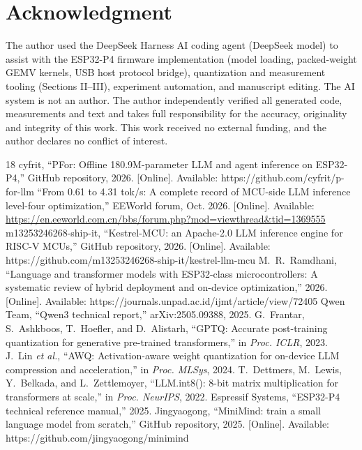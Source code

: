 \documentclass[journal,letterpaper]{IEEEtran}
\begin{document}
\section*{Acknowledgment}
The author used the DeepSeek Harness AI coding agent (DeepSeek model) to assist with the
ESP32-P4 firmware implementation (model loading, packed-weight GEMV kernels, USB host protocol
bridge), quantization and measurement tooling (Sections II--III), experiment automation, and
manuscript editing. The AI system is not an author. The author independently verified all
generated code, measurements and text and takes full responsibility for the accuracy,
originality and integrity of this work. This work received no external funding, and the author
declares no conflict of interest.

\begin{thebibliography}{18}
 cyfrit, ``PFor: Offline 180.9M-parameter LLM and agent inference on ESP32-P4,'' GitHub repository, 2026. [Online]. Available: https://github.com/cyfrit/p-for-llm
 ``From 0.61 to 4.31 tok/s: A complete record of MCU-side LLM inference level-four optimization,'' EEWorld forum, Oct. 2026. [Online]. Available: \url{https://en.eeworld.com.cn/bbs/forum.php?mod=viewthread&tid=1369555}
 m13253246268-ship-it, ``Kestrel-MCU: an Apache-2.0 LLM inference engine for RISC-V MCUs,'' GitHub repository, 2026. [Online]. Available: https://github.com/m13253246268-ship-it/kestrel-llm-mcu
 M.~R.~Ramdhani, ``Language and transformer models with ESP32-class microcontrollers: A systematic review of hybrid deployment and on-device optimization,'' 2026. [Online]. Available: https://journals.unpad.ac.id/ijmt/article/view/72405
 Qwen Team, ``Qwen3 technical report,'' arXiv:2505.09388, 2025.
 G.~Frantar, S.~Ashkboos, T.~Hoefler, and D.~Alistarh, ``GPTQ: Accurate post-training quantization for generative pre-trained transformers,'' in \emph{Proc. ICLR}, 2023.
 J.~Lin \emph{et al.}, ``AWQ: Activation-aware weight quantization for on-device LLM compression and acceleration,'' in \emph{Proc. MLSys}, 2024.
 T.~Dettmers, M.~Lewis, Y.~Belkada, and L.~Zettlemoyer, ``LLM.int8(): 8-bit matrix multiplication for transformers at scale,'' in \emph{Proc. NeurIPS}, 2022.
 Espressif Systems, ``ESP32-P4 technical reference manual,'' 2025.
 Jingyaogong, ``MiniMind: train a small language model from scratch,'' GitHub repository, 2025. [Online]. Available: https://github.com/jingyaogong/minimind

\end{thebibliography}
\end{document}
